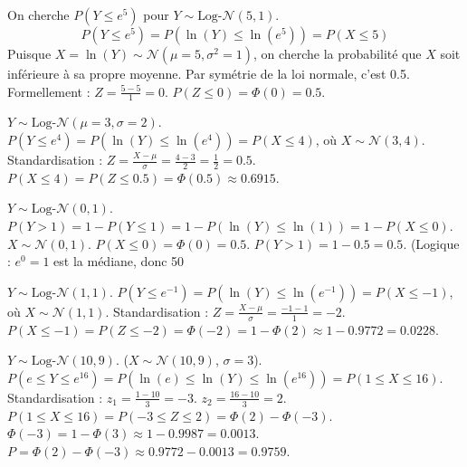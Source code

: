 \begin{correctionbox}
On cherche $P(Y \le e^5)$ pour $Y \sim \text{Log-}\mathcal{N}(5, 1)$.
$$P(Y \le e^5) = P(\ln(Y) \le \ln(e^5)) = P(X \le 5)$$
Puisque $X = \ln(Y) \sim \mathcal{N}(\mu=5, \sigma^2=1)$, on cherche la probabilité que $X$ soit inférieure à sa propre moyenne. Par symétrie de la loi normale, c'est 0.5.
Formellement : $Z = \frac{5 - 5}{1} = 0$. $P(Z \le 0) = \Phi(0) = 0.5$.
\end{correctionbox}

\begin{correctionbox}
$Y \sim \text{Log-}\mathcal{N}(\mu=3, \sigma=2)$.
$P(Y \le e^4) = P(\ln(Y) \le \ln(e^4)) = P(X \le 4)$, où $X \sim \mathcal{N}(3, 4)$.
Standardisation : $Z = \frac{X - \mu}{\sigma} = \frac{4 - 3}{2} = \frac{1}{2} = 0.5$.
$P(X \le 4) = P(Z \le 0.5) = \Phi(0.5) \approx 0.6915$.
\end{correctionbox}

\begin{correctionbox}
$Y \sim \text{Log-}\mathcal{N}(0, 1)$.
$P(Y > 1) = 1 - P(Y \le 1) = 1 - P(\ln(Y) \le \ln(1)) = 1 - P(X \le 0)$.
$X \sim \mathcal{N}(0, 1)$. $P(X \le 0) = \Phi(0) = 0.5$.
$P(Y > 1) = 1 - 0.5 = 0.5$. (Logique : $e^0=1$ est la médiane, donc 50%
\end{correctionbox}

\begin{correctionbox}
$Y \sim \text{Log-}\mathcal{N}(1, 1)$.
$P(Y \le e^{-1}) = P(\ln(Y) \le \ln(e^{-1})) = P(X \le -1)$, où $X \sim \mathcal{N}(1, 1)$.
Standardisation : $Z = \frac{X - \mu}{\sigma} = \frac{-1 - 1}{1} = -2$.
$P(X \le -1) = P(Z \le -2) = \Phi(-2) = 1 - \Phi(2) \approx 1 - 0.9772 = 0.0228$.
\end{correctionbox}

\begin{correctionbox}
$Y \sim \text{Log-}\mathcal{N}(10, 9)$. ($X \sim \mathcal{N}(10, 9)$, $\sigma=3$).
$P(e \le Y \le e^{16}) = P(\ln(e) \le \ln(Y) \le \ln(e^{16})) = P(1 \le X \le 16)$.
Standardisation :
$z_1 = \frac{1 - 10}{3} = -3$.
$z_2 = \frac{16 - 10}{3} = 2$.
$P(1 \le X \le 16) = P(-3 \le Z \le 2) = \Phi(2) - \Phi(-3)$.
$\Phi(-3) = 1 - \Phi(3) \approx 1 - 0.9987 = 0.0013$.
$P = \Phi(2) - \Phi(-3) \approx 0.9772 - 0.0013 = 0.9759$.
\end{correctionbox}

